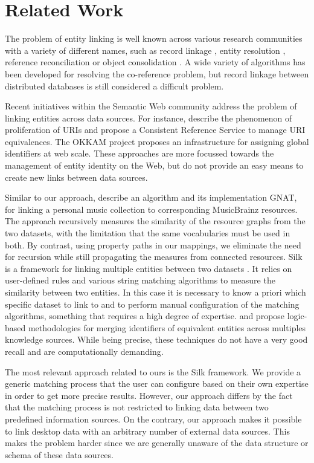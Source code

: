 \section{Related Work}
\label{sub:sdwodrelatedwork}

The problem of entity linking is well known across various research communities with a variety of different names, such as record linkage \cite{Felligi1969}, entity resolution \cite{Benjelloun2006}, reference reconciliation \cite{Dong2005b} or object consolidation \cite{Hogan2007}. A wide variety of algorithms has been developed for resolving the co-reference problem, but record linkage between distributed databases is still considered a  difficult problem.

Recent initiatives within the Semantic Web community address the problem of linking entities across data sources. For instance, \cite{Jaffri2007} describe the phenomenon of proliferation of URIs and propose a Consistent Reference Service to manage URI equivalences. The OKKAM project \cite{Bouquet2007} proposes an infrastructure for assigning global identifiers at web scale. These approaches are more focussed towards the management of entity identity on the Web, but do not provide an easy means to create new links between data sources. 

Similar to our approach, \cite{Raimond2008} describe an algorithm and its implementation GNAT, for linking a personal music collection to corresponding MusicBrainz resources. The approach recursively measures the similarity of the resource graphs from the two datasets, with the limitation that the same vocabularies must be used in both. By contrast, using property paths in our mappings, we eliminate the need for recursion while still propagating the measures from connected resources.
Silk is a framework for linking multiple entities between two datasets \cite{Bizer2009}. It relies on user-defined rules and various string matching algorithms to measure the similarity between two entities. In this case it is necessary to know a priori which specific dataset to link to and to perform manual configuration of the matching algorithms, something that requires a high degree of expertise.
\cite{Hogan2007} and \cite{Sais2007} propose logic-based methodologies for merging identifiers of equivalent entities across multiples knowledge sources. While being precise, these techniques do not have a very good recall and are computationally demanding.

The most relevant approach related to ours is the Silk framework. We provide a generic matching process that the user can configure based on their own expertise in order to get more precise results. However, our approach differs by the fact that the matching process is not restricted to linking data between two predefined information sources. On the contrary, our approach makes it possible to link desktop data with an arbitrary number of external data sources. This makes the problem harder since we are generally unaware of the data structure or schema of these data sources. 

